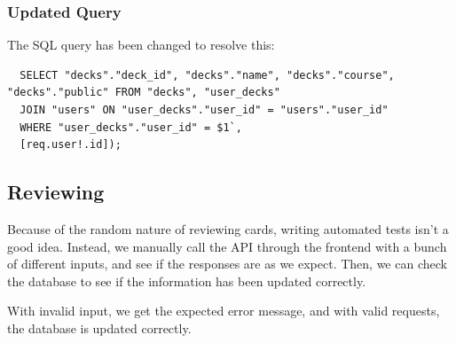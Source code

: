 \documentclass{report}
\begin{document}
\subsubsection{Updated Query}
The SQL query has been changed to resolve this:
\begin{verbatim}
  SELECT "decks"."deck_id", "decks"."name", "decks"."course", "decks"."public" FROM "decks", "user_decks"
  JOIN "users" ON "user_decks"."user_id" = "users"."user_id"
  WHERE "user_decks"."user_id" = $1`,
  [req.user!.id]);
\end{verbatim}

\subsection{Reviewing}
Because of the random nature of reviewing cards, writing automated tests isn't a good idea. Instead, we manually call the API through the frontend with a bunch of different inputs, and see if the responses are as we expect. Then, we can check the database to see if the information has been updated correctly.

With invalid input, we get the expected error message, and with valid requests, the database is updated correctly.

\printbibliography
\end{document}
